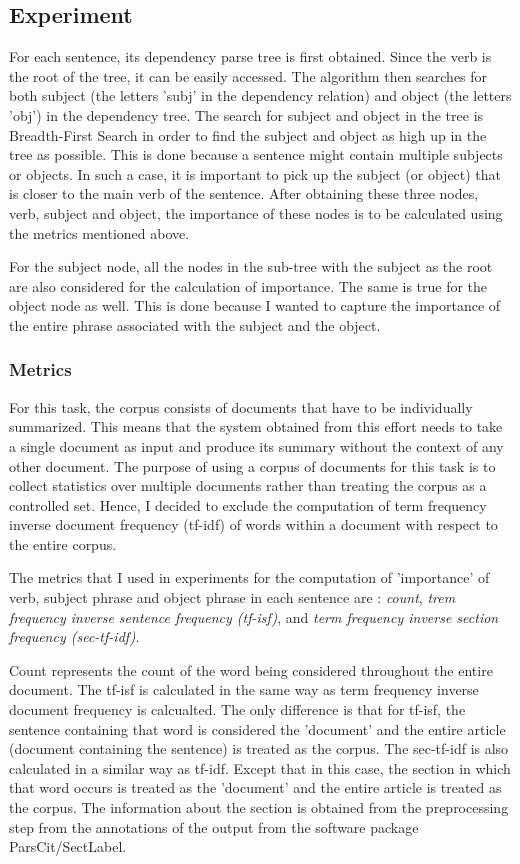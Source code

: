 \subsection{Experiment}
For each sentence, its dependency parse tree is first obtained.
Since the verb is the root of the tree, it can be easily accessed.
The algorithm then searches for both subject (the letters 'subj' in the dependency relation) and object (the letters 'obj') in the dependency tree.
The search for subject and object in the tree is Breadth-First Search in order to find the subject and object as high up in the tree as possible.
This is done because a sentence might contain multiple subjects or objects.
In such a case, it is important to pick up the subject (or object) that is closer to the main verb of the sentence.
After obtaining these three nodes, verb, subject and object, the importance of these nodes is to be calculated using the metrics mentioned above.

For the subject node, all the nodes in the sub-tree with the subject as the root are also considered for the calculation of importance.
The same is true for the object node as well.
This is done because I wanted to capture the importance of the entire phrase associated with the subject and the object.

\subsubsection*{Metrics}
For this task, the corpus consists of documents that have to be individually summarized.
This means that the system obtained from this effort needs to take a single document as input and produce its summary without the context of any other document.
The purpose of using a corpus of documents for this task is to collect statistics over multiple documents rather than treating the corpus as a controlled set.
Hence, I decided to exclude the computation of term frequency inverse document frequency (tf-idf) of words within a document with respect to the entire corpus.

The metrics that I used in experiments for the computation of 'importance' of verb, subject phrase and object phrase in each sentence are : \textit{count}, \textit{trem frequency inverse sentence frequency (tf-isf)}, and \textit{term frequency inverse section frequency (sec-tf-idf)}.

Count represents the count of the word being considered throughout the entire document.
The tf-isf is calculated in the same way as term frequency inverse document frequency is calcualted. The only difference is that for tf-isf, the sentence containing that word is considered the 'document' and the entire article (document containing the sentence) is treated as the corpus.
The sec-tf-idf is also calculated in a similar way as tf-idf.
Except that in this case, the section in which that word occurs is treated as the 'document' and the entire article is treated as the corpus.
The information about the section is obtained from the preprocessing step from the annotations of the output from the software package ParsCit/SectLabel.


